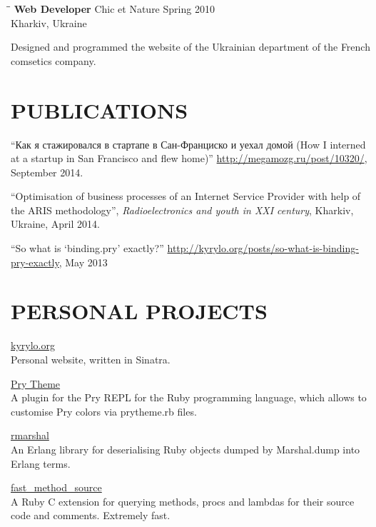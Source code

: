 \documentclass{res}
\begin{document}
\begin{resume}
  \begin{tabbing}%
    \hspace{2.3in}\= \hspace{2.6in}\= \kill %
    {\bf Web Developer}  \>Chic et Nature \> Spring  2010\\
    \>Kharkiv, Ukraine
  \end{tabbing}\vspace{-20pt}
  Designed and programmed the website of the Ukrainian department of the French
  comsetics company.

  \section{PUBLICATIONS}
  ``Как я стажировался в стартапе в Сан-Франциско и уехал домой (How I interned
  at a startup in San Francisco and flew home)'' \href{http://megamozg.ru/post/10320/}{http://megamozg.ru/post/10320/}, September 2014.

  ``Optimisation of business processes of an Internet Service Provider with help
  of the ARIS methodology'', {\it Radioelectronics and youth in XXI century},
  Kharkiv, Ukraine, April 2014.

  ``So what is ‘binding.pry’ exactly?'' \href{http://kyrylo.org/posts/so-what-is-binding-pry-exactly}{http://kyrylo.org/posts/so-what-is-binding-pry-exactly}, May 2013

  \section{PERSONAL PROJECTS}
  \href{http://kyrylo.org}{kyrylo.org}
  \\
  Personal website, written in Sinatra.

  \href{https://github.com/kyrylo/pry-theme}{Pry Theme}
  \\
  A plugin for the Pry REPL for the Ruby programming language, which allows to
  customise Pry colors via prytheme.rb files.

  \href{https://github.com/kyrylo/rmarshal}{rmarshal}
  \\
  An Erlang library for deserialising Ruby objects dumped by Marshal.dump into
  Erlang terms.

  \href{https://github.com/kyrylo/fast_method_source}{fast\_method\_source}
  \\
  A Ruby C extension for querying methods, procs and lambdas for their source
  code and comments. Extremely fast.


\end{resume}
\end{document}
